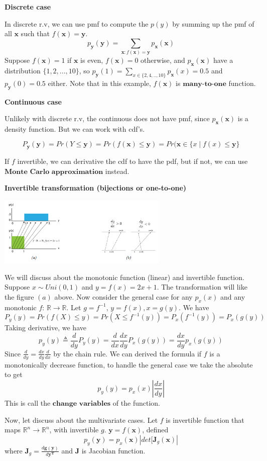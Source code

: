\documentclass[10pt,landscape]{article}
\newcommand{\inp}{\textbf{x}}
\newcommand{\out}{\textbf{y}}
\newcommand{\R}{\mathbb{R}}
\begin{document}
\begin{multicols*}{3}
\textbf{Discrete case}

In discrete r.v, we can use pmf to compute the $p(y)$ by summing up the pmf of all $\inp$ such that $f(\inp)=\out$.
\[
    p_{\out}(\out)=\sum_{\inp:f(\inp)=\out}p_{\inp}(\inp)
\]
Suppose $f(\inp)=1$ if $\inp$ is even, $f(\inp)=0$ otherwise, and \(p_{\inp}(\inp)\) have a distribution $\{1,2,...,10\}$, so $p_{\out}(1)=\sum_{x\in\{2,4,..,10\}}p_{\inp}(x)=0.5$ and $p_{\out}(0)=0.5$ either. Note that in this example, $f(\inp)$ is $\textbf{many-to-one}$ function.

\textbf{Continuous case}

Unlikely with discrete r.v, the continuous does not have pmf, since $p_{\inp}(\inp)$ is a density function. But we can work with cdf's.

\[
    P_{\out}(\out)=Pr(Y\leq \out) = Pr(f(\inp) \leq \out)=Pr(\inp\in\{x \mid f(x) \leq \out\}
\]

If $f$ invertible, we can derivative the cdf to have the pdf, but if not, we can use $\textbf{Monte Carlo approximation}$ instead.

\textbf{Invertible transformation (bijections or one-to-one)}
\begin{minipage}{\linewidth}
    \centering
    \includegraphics[width=3.2in]{figures/bijection.PNG}
\end{minipage}
We will discuss about the monotonic function (linear) and invertible function. Suppose $x\sim Uni(0,1)$ and $y=f(x)=2x+1$. The transformation will like the figure $(a)$ above.
Now consider the general case for any $p_x(x)$ and any monotonic $f$: $\R\rightarrow\R$. Let $g=f^{-1}$, $y=f(x),x=g(y)$. We have
\[
    P_y(y)=Pr(f(X)\leq y)=Pr(X\leq f^{-1}(y))=P_x(f^{-1}(y))=P_x(g(y))
\]
Taking derivative, we have
\[
    p_y(y) \triangleq  \frac{d}{dy}P_y(y)=\frac{d}{dx}\frac{dx}{dy}P_x(g(y))=\frac{dx}{dy}p_x(g(y))
\]
Since \(\frac{d}{dy}=\frac{dx}{dy}\frac{d}{dx}\) by the chain rule. We can derived the formula if $f$ is a monotonically decrease function, to handle the general case we take the absolute to get
\[
    p_y(y)=p_x(x)|\frac{dx}{dy}|
\]
This is call the $\textbf{change variables}$ of the function.

Now, let discuss about the multivariate cases. Let $f$ is invertible function that maps $\R^n\rightarrow\R^n$, with invertible $g$. $\out=f(\inp)$, defined
\[
    p_y(\out)=p_x(\inp)|det[\mathbf{J}_g(\inp)|
\]
where $\mathbf{J}_g=\frac{d\mathbf{g(y)}}{d\mathbf{y^T}}$ and $\mathbf J$ is Jacobian function.


\end{multicols*}
\end{document}
